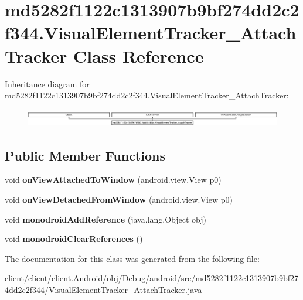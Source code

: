 \hypertarget{classmd5282f1122c1313907b9bf274dd2c2f344_1_1VisualElementTracker__AttachTracker}{}\section{md5282f1122c1313907b9bf274dd2c2f344.\+Visual\+Element\+Tracker\+\_\+\+Attach\+Tracker Class Reference}
\label{classmd5282f1122c1313907b9bf274dd2c2f344_1_1VisualElementTracker__AttachTracker}
Inheritance diagram for md5282f1122c1313907b9bf274dd2c2f344.\+Visual\+Element\+Tracker\+\_\+\+Attach\+Tracker\+:\begin{figure}[H]
\begin{center}
\leavevmode
\includegraphics[height=0.790960cm]{classmd5282f1122c1313907b9bf274dd2c2f344_1_1VisualElementTracker__AttachTracker}
\end{center}
\end{figure}
\subsection*{Public Member Functions}
\begin{DoxyCompactItemize}
\item 
\hypertarget{classmd5282f1122c1313907b9bf274dd2c2f344_1_1VisualElementTracker__AttachTracker_ac5ad66aae4dd8c5b775c83fd4ea417a3}{}void {\bfseries on\+View\+Attached\+To\+Window} (android.\+view.\+View p0)\label{classmd5282f1122c1313907b9bf274dd2c2f344_1_1VisualElementTracker__AttachTracker_ac5ad66aae4dd8c5b775c83fd4ea417a3}

\item 
\hypertarget{classmd5282f1122c1313907b9bf274dd2c2f344_1_1VisualElementTracker__AttachTracker_a18ce0c9fce46b8c9721a6b75efb28670}{}void {\bfseries on\+View\+Detached\+From\+Window} (android.\+view.\+View p0)\label{classmd5282f1122c1313907b9bf274dd2c2f344_1_1VisualElementTracker__AttachTracker_a18ce0c9fce46b8c9721a6b75efb28670}

\item 
\hypertarget{classmd5282f1122c1313907b9bf274dd2c2f344_1_1VisualElementTracker__AttachTracker_a2eb9ffc2e711a6155ee4054ea3a3567c}{}void {\bfseries monodroid\+Add\+Reference} (java.\+lang.\+Object obj)\label{classmd5282f1122c1313907b9bf274dd2c2f344_1_1VisualElementTracker__AttachTracker_a2eb9ffc2e711a6155ee4054ea3a3567c}

\item 
\hypertarget{classmd5282f1122c1313907b9bf274dd2c2f344_1_1VisualElementTracker__AttachTracker_a1311858cdb6b6796da0e0d4763119e6b}{}void {\bfseries monodroid\+Clear\+References} ()\label{classmd5282f1122c1313907b9bf274dd2c2f344_1_1VisualElementTracker__AttachTracker_a1311858cdb6b6796da0e0d4763119e6b}

\end{DoxyCompactItemize}


The documentation for this class was generated from the following file\+:\begin{DoxyCompactItemize}
\item 
client/client/client.\+Android/obj/\+Debug/android/src/md5282f1122c1313907b9bf274dd2c2f344/Visual\+Element\+Tracker\+\_\+\+Attach\+Tracker.\+java\end{DoxyCompactItemize}
